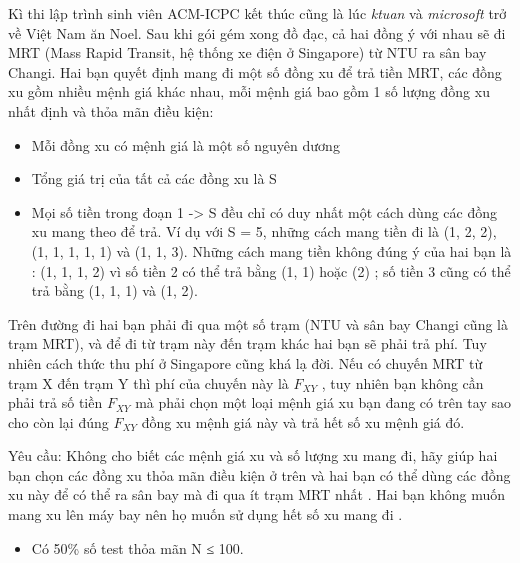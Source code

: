Kì thi lập trình sinh viên ACM-ICPC kết thúc cũng là lúc   \textit{    ktuan   }   và   \textit{    microsoft   }   trở về Việt Nam ăn Noel. Sau khi gói gém xong đồ đạc, cả hai đồng ý với nhau sẽ đi MRT (Mass Rapid Transit, hệ thống xe điện ở Singapore) từ NTU ra sân bay Changi. Hai bạn quyết định mang đi một số đồng xu để trả tiền MRT, các đồng xu gồm nhiều mệnh giá khác nhau, mỗi mệnh giá bao gồm 1 số lượng đồng xu nhất định và thỏa mãn điều kiện:  
\begin{itemize}
	\item     Mỗi đồng xu có mệnh giá là một số nguyên dương   
	\item     Tổng giá trị của tất cả các đồng xu là S   
	\item     Mọi số tiền trong đoạn 1 -> S đều chỉ có duy nhất một cách dùng các đồng xu mang theo để trả. Ví dụ với S = 5, những cách mang tiền đi là (1, 2, 2), (1, 1, 1, 1, 1) và (1, 1, 3). Những cách mang tiền không đúng ý của hai bạn là : (1, 1, 1, 2) vì số tiền 2 có thể trả bằng (1, 1) hoặc (2) ; số tiền 3 cũng có thể trả bằng (1, 1, 1) và (1, 2).   
\end{itemize}

   Trên đường đi hai bạn phải đi qua một số trạm (NTU và sân bay Changi cũng là trạm MRT), và để đi từ trạm này đến trạm khác hai bạn sẽ phải trả phí. Tuy nhiên cách thức thu phí ở Singapore cũng khá lạ đời. Nếu có chuyến MRT từ trạm X đến trạm Y thì phí của chuyến này là $F_{XY}$   , tuy nhiên bạn không cần phải trả số tiền $F_{XY}$   mà       phải chọn một loại mệnh giá xu         bạn đang có        trên tay sao cho còn lại đúng $F_{XY}$    đồng xu mệnh giá này và trả hết số xu mệnh giá đó.     

       Yêu cầu:      Không cho biết các mệnh giá xu và số lượng xu mang đi, hãy giúp hai bạn chọn các đồng xu       thỏa mãn điều kiện ở trên      và hai bạn có thể dùng các đồng xu này để       có thể ra sân bay      mà       đi qua ít trạm MRT nhất      . Hai bạn không muốn mang xu lên máy bay nên họ muốn       sử dụng hết số xu mang đi      .
\begin{itemize}
	\item     Có 50\% số test thỏa mãn N ≤ 100.   
\end{itemize}
